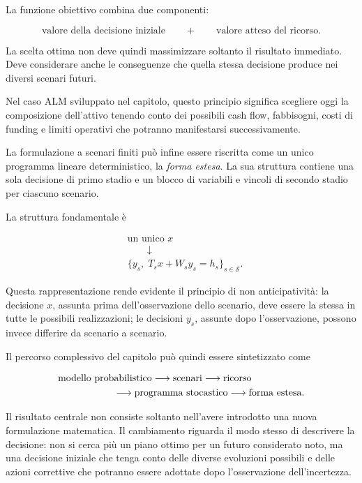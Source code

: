 La funzione obiettivo combina due componenti:

\[
\text{valore della decisione iniziale}
\qquad+\qquad
\text{valore atteso del ricorso}.
\]

La scelta ottima non deve quindi massimizzare soltanto il risultato immediato.
Deve considerare anche le conseguenze che quella stessa decisione produce nei
diversi scenari futuri.

Nel caso ALM sviluppato nel capitolo, questo principio significa scegliere
oggi la composizione dell'attivo tenendo conto dei possibili cash flow,
fabbisogni, costi di funding e limiti operativi che potranno manifestarsi
successivamente.

La formulazione a scenari finiti pu\`o infine essere riscritta come un unico
programma lineare deterministico, la \emph{forma estesa}. La sua struttura
contiene una sola decisione di primo stadio e un blocco di variabili e vincoli
di secondo stadio per ciascuno scenario.

La struttura fondamentale \`e

\[
\begin{aligned}
&\text{un unico }x
\\
&\qquad\downarrow
\\
&\{y_s,\;T_sx+W_sy_s=h_s\}_{s\in\mathcal S}.
\end{aligned}
\]

Questa rappresentazione rende evidente il principio di non anticipativit\`a:
la decisione $x$, assunta prima dell'osservazione dello scenario, deve essere
la stessa in tutte le possibili realizzazioni; le decisioni $y_s$, assunte
dopo l'osservazione, possono invece differire da scenario a scenario.

Il percorso complessivo del capitolo pu\`o quindi essere sintetizzato come

\[
\begin{aligned}
&\text{modello probabilistico}
\longrightarrow
\text{scenari}
\longrightarrow
\text{ricorso}
\\
&\hspace{2.0cm}
\longrightarrow
\text{programma stocastico}
\longrightarrow
\text{forma estesa}.
\end{aligned}
\]

Il risultato centrale non consiste soltanto nell'avere introdotto una nuova
formulazione matematica. Il cambiamento riguarda il modo stesso di descrivere
la decisione: non si cerca pi\`u un piano ottimo per un futuro considerato
noto, ma una decisione iniziale che tenga conto delle diverse evoluzioni
possibili e delle azioni correttive che potranno essere adottate dopo
l'osservazione dell'incertezza.

